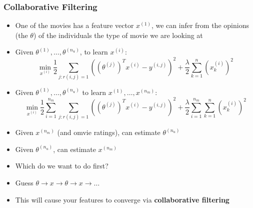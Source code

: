 \subsubsection{Collaborative Filtering}
\begin{itemize}[--]
	\item One of the movies has a feature vector $x^{(1)}$, we can infer from the opinions (the $\theta$) of the individuals the type of movie we are looking at
	\item Given $\theta^{(1)},\ldots, \theta^{(n_u)}$, to learn $x^{(i)}$:
		$$\min_{x^{(i)}}\frac{1}{2}\sum_{j:r(i,j)=1}((\theta^{(j)})^T x^{(i)} - y^{(i,j)})^2 + \frac{\lambda}{2}\sum_{k=1}^n (x_k^{(i)})^2$$
	\item Given $\theta^{(1)},\ldots,\theta^{(n_u)}$ to learn $x^{(1)},\ldots , x^{(n_m)}$:
		$$\min_{x^{(i)}}\frac{1}{2}\sum_{i=1}^{n_m}\sum_{j:r(i,j)=1}((\theta^{(j)})^T x^{(i)} - y^{(i,j)})^2 + \frac{\lambda}{2}\sum_{i=1}^{n_m}\sum_{k=1}^n (x_k^{(i)})^2$$
	\item Given $x^{(n_m)}$ (and omvie ratings), can estimate $\theta^{(n_u)}$
	\item Given $\theta^{(n_u)}$, can estimate $x^{(n_m)}$
	\item Which do we want to do first?
	\item Guess $\theta\to x\to\theta\to x\to\ldots$
	\item This will cause your features to converge via \textbf{collaborative filtering}
\end{itemize}

